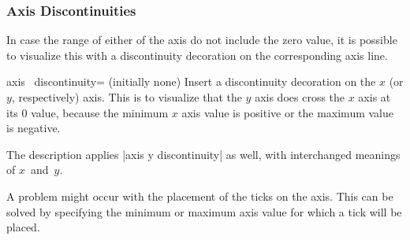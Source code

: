\subsubsection{Axis Discontinuities}
In case the range of either of the axis do not include the zero value, it is possible to visualize this with a discontinuity decoration on the corresponding axis line.

\begin{pgfplotsxykey}{axis \x\ discontinuity= (initially none)}
Insert a discontinuity decoration on the $x$ (or $y$, respectively) axis. 
This is to visualize that the $y$ axis does cross the $x$ axis at its $0$ value, because the minimum $x$ axis value is positive or the maximum value is negative.

The description applies |axis y discontinuity| as well, with interchanged meanings of $x$~and~$y$.

\begin{codeexample}[]
\end{codeexample}

\begin{codeexample}[]
\end{codeexample}
\end{pgfplotsxykey}

A problem might occur with the placement of the ticks on the axis.
This can be solved by specifying the minimum or maximum axis value for which a tick will be placed.

